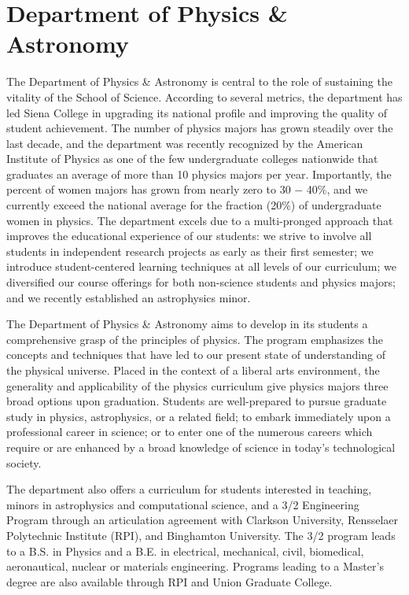 \documentclass[12pt, preprint]{aastex}
\begin{document}
\section{Department of Physics \& Astronomy}
The Department of Physics \& Astronomy is central to the role of
sustaining the vitality of the School of Science. According to several metrics, the department has
led Siena College in upgrading its national profile and improving the
quality of student achievement. The number of physics majors has grown
steadily over the last decade, and the department was recently
recognized by the American Institute of Physics as one of the few
undergraduate colleges nationwide that graduates an average of more
than 10 physics majors per year. Importantly, the percent of women
majors has grown from nearly zero to 30 − 40\%, and we currently exceed
the national average for the fraction (20\%) of undergraduate women in
 physics. The department excels due to a multi-pronged approach that
 improves the educational experience of our students: we strive to
 involve all students in independent research projects as early as their
 first semester; we introduce student-centered learning techniques at all levels of our curriculum; we
 diversified our course offerings for both non-science students and
 physics majors; and we recently established an astrophysics minor.

		
The Department of Physics \& Astronomy aims to develop in its students a
comprehensive grasp of the principles of physics. The program emphasizes the
concepts and techniques that have led to our present state of understanding of
the physical universe. Placed in the context of a liberal arts environment, the
generality and applicability of the physics curriculum give physics majors three
broad options upon graduation. Students are well-prepared to pursue graduate
study in physics, astrophysics, or a related field; to embark immediately upon a
professional career in science; or to enter one of the numerous careers which
require or are enhanced by a broad knowledge of science in today's technological
society.
					
The department also offers a curriculum for students interested in teaching,
minors in astrophysics and computational science, and a 3/2 Engineering Program
through an articulation agreement with Clarkson University, Rensselaer
Polytechnic Institute (RPI), and Binghamton University.  The 3/2 program leads
to a B.S. in Physics and a B.E. in electrical, mechanical, civil, biomedical,
aeronautical, nuclear or materials engineering.  Programs leading to a Master’s
degree are also available through RPI and Union Graduate College.
\end{document}
